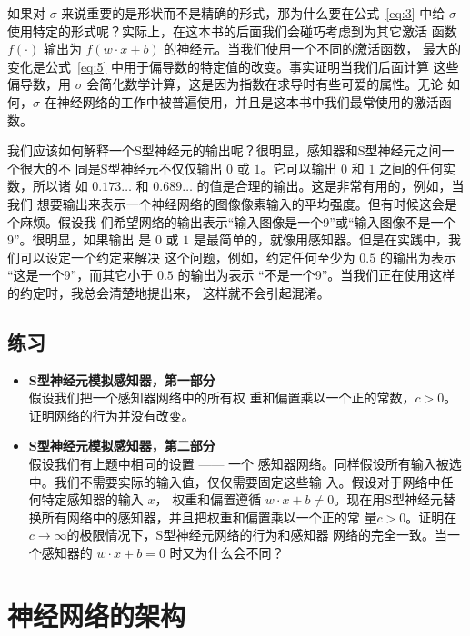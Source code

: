 如果对 $\sigma$ 来说重要的是形状而不是精确的形式，那为什么要在公式~\eqref{eq:3}
中给 $\sigma$ 使用特定的形式呢？实际上，在这本书的后面我们会碰巧考虑到为其它激活
函数 $f(\cdot)$ 输出为 $f(w \cdot x + b)$ 的神经元。当我们使用一个不同的激活函数，
最大的变化是公式~\eqref{eq:5} 中用于偏导数的特定值的改变。事实证明当我们后面计算
这些偏导数，用 $\sigma$ 会简化数学计算，这是因为指数在求导时有些可爱的属性。无论
如何，$\sigma$ 在神经网络的工作中被普遍使用，并且是这本书中我们最常使用的激活函
数。

我们应该如何解释一个S型神经元的输出呢？很明显，感知器和S型神经元之间一个很大的不
同是S型神经元不仅仅输出 $0$ 或 $1$。它可以输出 $0$ 和 $1$ 之间的任何实数，所以诸
如 $0.173\ldots$ 和 $0.689\ldots$ 的值是合理的输出。这是非常有用的，例如，当我们
想要输出来表示一个神经网络的图像像素输入的平均强度。但有时候这会是个麻烦。假设我
们希望网络的输出表示“输入图像是一个9”或“输入图像不是一个9”。很明显，如果输出
是 $0$ 或 $1$ 是最简单的，就像用感知器。但是在实践中，我们可以设定一个约定来解决
这个问题，例如，约定任何至少为 $0.5$ 的输出为表示 “这是一个9”，而其它小于
$0.5$ 的输出为表示 “不是一个9”。当我们正在使用这样的约定时，我总会清楚地提出来，
这样就不会引起混淆。

\subsection*{练习}

\begin{itemize}
\item \textbf{S型神经元模拟感知器，第一部分}\\假设我们把一个感知器网络中的所有权
  重和偏置乘以一个正的常数，$c>0$。证明网络的行为并没有改变。
\item \textbf{S型神经元模拟感知器，第二部分}\\假设我们有上题中相同的设置 —— 一个
  感知器网络。同样假设所有输入被选中。我们不需要实际的输入值，仅仅需要固定这些输
  入。假设对于网络中任何特定感知器的输入 $x$， 权重和偏置遵循 $w \cdot x + b
  \neq 0$。现在用S型神经元替换所有网络中的感知器，并且把权重和偏置乘以一个正的常
  量$c>0$。证明在$c \rightarrow \infty$的极限情况下，S型神经元网络的行为和感知器
  网络的完全一致。当一个感知器的 $w \cdot x + b = 0$ 时又为什么会不同？
\end{itemize}

\section{神经网络的架构}

